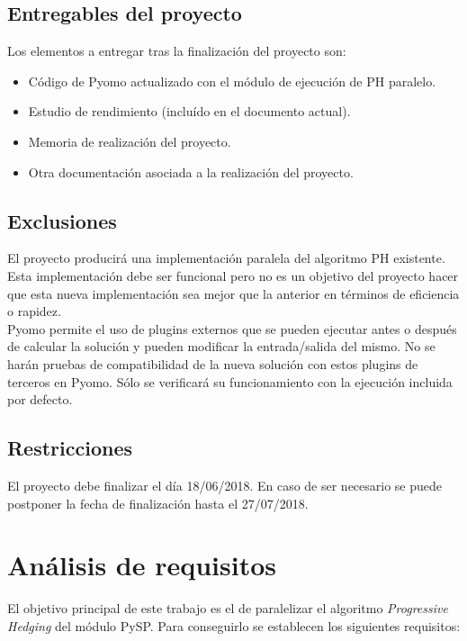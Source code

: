 \subsection{Entregables del proyecto}

Los elementos a entregar tras la finalización del proyecto son:

\begin{itemize}
    \item Código de Pyomo actualizado con el módulo de ejecución de PH paralelo.
    \item Estudio de rendimiento (incluído en el documento actual).
    \item Memoria de realización del proyecto.
    \item Otra documentación asociada a la realización del proyecto.
\end{itemize}

\subsection{Exclusiones}

El proyecto producirá una implementación paralela del algoritmo PH existente. Esta implementación debe ser funcional pero no es un objetivo del proyecto hacer que esta nueva implementación sea mejor que la anterior en términos de eficiencia o rapidez.\\

Pyomo permite el uso de plugins externos que se pueden ejecutar antes o después de calcular la solución y pueden modificar la entrada/salida del mismo. No se harán pruebas de compatibilidad de la nueva solución con estos plugins de terceros en Pyomo. Sólo se verificará su funcionamiento con la ejecución incluida por defecto.

\subsection{Restricciones}

El proyecto debe finalizar el día 18/06/2018. En caso de ser necesario se puede postponer la fecha de finalización hasta el 27/07/2018.

\section{Análisis de requisitos}

El objetivo principal de este trabajo es el de paralelizar el algoritmo \textit{Progressive Hedging} del módulo PySP. Para conseguirlo se establecen los siguientes requisitos:

